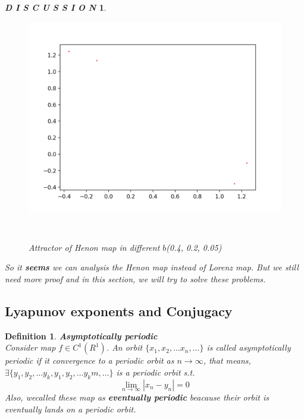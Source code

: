 \documentclass[12pt]{article}
\theoremstyle{plain}
\newtheorem{definition}{\textbf{Definition}}[section]
\newtheorem{discussion}{\textit{D I S C U S S I O N}}[section]
\begin{document}
\begin{discussion}
\begin{figure}[H]
\begin{minipage}[c][0.32\width]{0.32\textwidth}
\end{minipage}
\begin{minipage}[c][0.32\width]{0.32\textwidth}
   \centering
   \includegraphics[width=\textwidth]{figure/section2/Henon-attractor-1*2-0*05.png}
\end{minipage}
\\[3ex]\caption{Attractor of Henon map in different $b$(0.4, 0.2, 0.05)}\label{Henon-map-b}
\end{figure}



So it \textbf{seems} we can analysis the Henon map instead of Lorenz map. But we still need more proof and in this section, we will try to solve these problems.



\end{discussion}












\subsection{Lyapunov exponents and Conjugacy}

\begin{definition} \textbf{Asymptotically periodic}
\\\noindent Consider map $f \in C^1(R^1)$. An orbit $\{x_1, x_2, \ldots x_n, \ldots\}$ is called asymptotically periodic if it convergence to a periodic orbit as $n \rightarrow \infty$, that means, $\exists \{y_1, y_2, \ldots y_k, y_1, y_2, \ldots y_km ,\ldots\}$ is a periodic orbit s.t.
$$
\lim_{n \rightarrow \infty} |x_n - y_n| = 0
$$
Also, wecalled these map as \textbf{eventually periodic} beacause their orbit is eventually lands on a periodic orbit.
\end{definition} 
\end{document}
